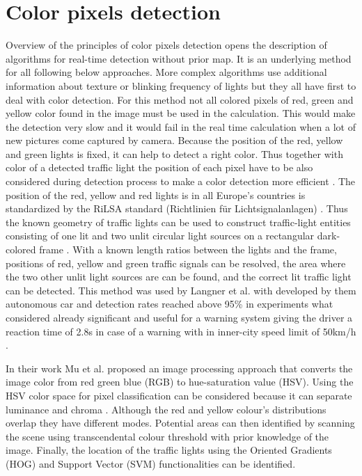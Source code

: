 \documentclass[letterpaper, 10 pt, conference]{ieeeconf} %
\begin{document}
\section{Color pixels detection}
Overview of the principles of color pixels detection opens the description of algorithms for real-time detection without prior map. It is an underlying method for all following below approaches. More complex algorithms use additional information about texture or blinking frequency of lights but they all have first to deal with color detection. For this method not all colored pixels of red, green and yellow color found in the image must be used in the calculation. This would make the detection very slow and it would fail in the real time calculation when a lot of new pictures come captured by camera. Because the position of the red, yellow and green lights is fixed, it can help to detect a right color. Thus together with color of a detected traffic light the position of each pixel have to be also considered during detection process to make a color detection more efficient \cite{c4}. The position of the red, yellow and red lights is in all Europe's countries is standardized by the RiLSA standard (Richtlinien f\"ur Lichtsignalanlagen) \cite{c4}. Thus the known geometry of traffic lights can be used to construct traffic-light entities consisting of one lit and two unlit circular light sources on a rectangular dark-colored frame \cite{c4}.
With a known length ratios between the lights and the frame, positions of red, yellow and green traffic signals can be resolved, the area where the two other unlit light sources are can be found, and the correct lit traffic light can be detected. This method was used by Langner et al. with developed by them autonomous car and detection rates reached above 95\% in experiments what considered already significant and useful for a warning system giving the driver a reaction time of 2.8s in case of a warning with in inner-city speed limit of 50km/h \cite{c4}.

In their work Mu et al. \cite{c9} \cite{c7} proposed an image processing approach that converts the image color from red green blue (RGB) to hue-saturation value (HSV). Using the HSV color space for pixel classification can be considered because it can separate luminance and chroma \cite{c4}. Although the red and yellow colour's distributions overlap they have different modes. Potential areas can then identified by scanning the scene using transcendental colour threshold with prior knowledge of the image. Finally, the location of the traffic lights using the Oriented Gradients (HOG) and Support Vector (SVM) functionalities can be identified.
\end{document}
